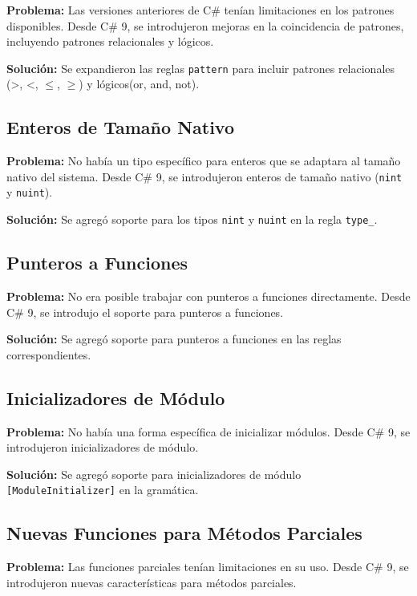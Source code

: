 \textbf{Problema:} Las versiones anteriores de C\# tenían limitaciones en los patrones disponibles. Desde C\# 9, se introdujeron mejoras en la coincidencia de patrones, incluyendo patrones relacionales y lógicos.

\textbf{Solución:} Se expandieron las reglas \texttt{pattern} para incluir patrones relacionales (>, <, $\leq$, $\geq$) y lógicos(or, and, not).

\subsection*{Enteros de Tamaño Nativo}

\textbf{Problema:} No había un tipo específico para enteros que se adaptara al tamaño nativo del sistema. Desde C\# 9, se introdujeron enteros de tamaño nativo (\texttt{nint} y \texttt{nuint}).

\textbf{Solución:} Se agregó soporte para los tipos \texttt{nint} y \texttt{nuint} en la regla \texttt{type\_}.

\subsection*{Punteros a Funciones}

\textbf{Problema:} No era posible trabajar con punteros a funciones directamente. Desde C\# 9, se introdujo el soporte para punteros a funciones.

\textbf{Solución:} Se agregó soporte para punteros a funciones en las reglas correspondientes.

\subsection*{Inicializadores de Módulo}

\textbf{Problema:} No había una forma específica de inicializar módulos. Desde C\# 9, se introdujeron inicializadores de módulo.

\textbf{Solución:} Se agregó soporte para inicializadores de módulo \texttt{[ModuleInitializer]} en la gramática.

\subsection*{Nuevas Funciones para Métodos Parciales}

\textbf{Problema:} Las funciones parciales tenían limitaciones en su uso. Desde C\# 9, se introdujeron nuevas características para métodos parciales.

